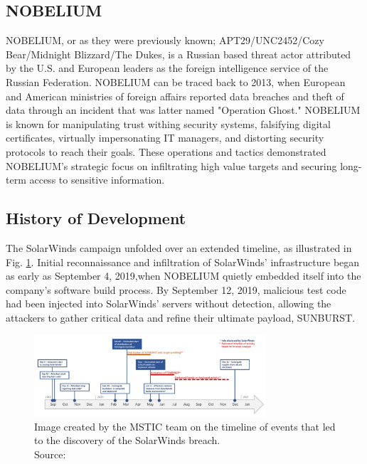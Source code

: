 \documentclass[conference]{IEEEtran}
\begin{document}
\subsection{NOBELIUM}
NOBELIUM, or as they were previously known; APT29/UNC2452/Cozy Bear/Midnight Blizzard/The Dukes,
is a Russian based threat actor attributed by the U.S. and European leaders as the foreign
intelligence service of the Russian Federation\cite{Microdoft2024NOBELIUM}. NOBELIUM can be traced back
to 2013, when European and American ministries of foreign affairs reported data breaches and theft of data 
through an incident that was latter named "Operation Ghost."\cite{MITREFirstNOBELIUMAttack} NOBELIUM is known for manipulating trust
withing security systems, falsifying digital certificates, virtually impersonating IT managers, and distorting security protocols
to reach their goals. These operations and tactics demonstrated NOBELIUM's strategic focus on infiltrating
high value targets and securing long-term access to sensitive information.\\

\subsection{History of Development}
The SolarWinds campaign unfolded over an extended timeline, as illustrated in Fig. \ref{fig:Timeline-of-Solorigate-attacks}. Initial 
reconnaissance and infiltration of SolarWinds’ infrastructure began as early as September 4, 2019,when NOBELIUM quietly embedded itself 
into the company’s software build process. By September 12, 2019, malicious test code had been injected into SolarWinds’ servers without
 detection, allowing the attackers to gather critical data and refine their ultimate payload, SUNBURST.\cite{MicrosoftDeepDiveSOLORIGATE}
\begin{figure}[H]
    \centering
    \includegraphics[width=3.4in]{Timeline-of-Solorigate-attacks.png}
    \caption{Image created by the MSTIC team on the timeline of events that led to the discovery of the SolarWinds
    breach.\\Source: \cite{MicrosoftDeepDiveSOLORIGATE} }
    \label{fig:Timeline-of-Solorigate-attacks}
\end{figure}
\end{document}
